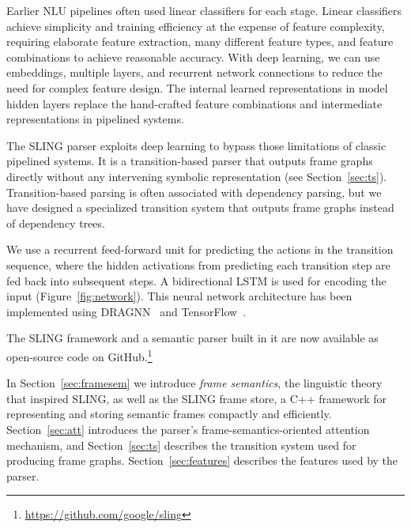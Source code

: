 \documentclass[11pt,a4paper]{article}
\begin{document}
Earlier NLU pipelines often used linear classifiers for each stage.
Linear classifiers achieve simplicity and training efficiency at the expense of
feature complexity, requiring elaborate feature
extraction, many different feature types, and
feature combinations to achieve reasonable accuracy.
With deep learning, we can use embeddings, multiple layers, and recurrent
network connections to reduce the need for complex
feature design. The internal learned representations in model hidden layers
replace the hand-crafted feature combinations and intermediate representations
in pipelined systems.


The SLING parser exploits deep learning to bypass those limitations of classic
pipelined systems.
It is a transition-based parser that outputs frame graphs directly without any
intervening symbolic representation (see Section~\ref{sec:ts}). Transition-based
parsing is often associated with dependency parsing, but we have designed a
specialized transition system that outputs frame graphs instead of dependency
trees.

We use a recurrent feed-forward unit for predicting the actions in the
transition sequence, where the hidden activations from predicting each
transition step are fed back into subsequent steps.
A bidirectional LSTM is used for encoding the input (Figure~\ref{fig:network}).
This neural network architecture has been implemented using DRAGNN~\cite{dragnn}
and TensorFlow~\cite{tensorflow}.

The SLING framework and a semantic parser built in it are now available as
open-source code on GitHub.\footnote{\url{https://github.com/google/sling}}

In Section~\ref{sec:framesem} we introduce \emph{frame semantics}, the
linguistic theory that inspired SLING, as well as the SLING frame store, a
C++ framework for representing and storing semantic frames compactly and
efficiently.
Section~\ref{sec:att} introduces the parser's frame-semantics-oriented attention
mechanism, and Section~\ref{sec:ts} describes the transition system used for
producing frame graphs. Section~\ref{sec:features} describes the features used
by the parser.
\end{document}
